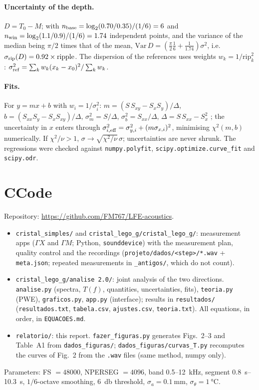 \documentclass[9pt,a4paper,twocolumn]{extarticle}
\newcommand{\umm}{\milli\metre}
\newcommand{\ukHz}{\kilo\hertz}
\newcommand{\udB}{\decibel}
\newcommand{\us}{\second}
\newcommand{\GX}{\ensuremath{\Gamma X}}
\newcommand{\GM}{\ensuremath{\Gamma M}}
\begin{document}
\paragraph{Uncertainty of the depth.} $D=T_0-M$; with $n_{\rm base}=\log_2(0.70/0.35)/(1/6)=6$ and $n_{\rm win}=\log_2(1.1/0.9)/(1/6)=1.74$ independent points, and the variance of the median being $\pi/2$ times that of the mean, $\mathrm{Var}\,D=\left(\frac\pi2\frac16+\frac1{1.74}\right)\sigma^2$, i.e.\ $\sigma_{\rm rip}(D)=0.92\times\mathrm{ripple}$. The dispersion of the references uses weights $w_k=1/\mathrm{rip}_k^2$: $\sigma_{\rm ref}^2=\sum_kw_k(x_k-x_0)^2/\sum_kw_k$.

\paragraph{Fits.} For $y=mx+b$ with $w_i=1/\sigma_i^2$: $m=(S\,S_{xy}-S_xS_y)/\Delta$, $b=(S_{xx}S_y-S_xS_{xy})/\Delta$, $\sigma_m^2=S/\Delta$, $\sigma_b^2=S_{xx}/\Delta$, $\Delta=S\,S_{xx}-S_x^2$ \cite{bev}; the uncertainty in $x$ enters through $\sigma_{i,\rm eff}^2=\sigma_{y,i}^2+(m\sigma_{x,i})^2$, minimising $\chi^2(m,b)$ numerically. If $\chi^2/\nu>1$, $\sigma\to\sqrt{\chi^2/\nu}\,\sigma$; uncertainties are never shrunk. The regressions were checked against \texttt{numpy.polyfit}, \texttt{scipy.optimize.curve\_fit} and \texttt{scipy.odr}.

\section*{C\quad Code}
Repository: \url{https://github.com/FM767/LFE-acoustics}.
\begin{itemize}\setlength{\itemsep}{0pt}
\item \texttt{cristal\_simples/} and \texttt{cristal\_lego\_g/cristal\_lego\_g/}: measurement apps (\GX{} and \GM; Python, \texttt{sounddevice}) with the measurement plan, quality control and the recordings (\texttt{projeto/dados/<step>/*.wav} + \texttt{meta.json}; repeated measurements in \texttt{\_antigos/}, which do not count).
\item \texttt{cristal\_lego\_g/analise 2.0/}: joint analysis of the two directions. \texttt{analise.py} (spectra, $T(f)$, quantities, uncertainties, fits), \texttt{teoria.py} (PWE), \texttt{graficos.py}, \texttt{app.py} (interface); results in \texttt{resultados/} (\texttt{resultados.txt}, \texttt{tabela.csv}, \texttt{ajustes.csv}, \texttt{teoria.txt}). All equations, in order, in \texttt{EQUACOES.md}.
\item \texttt{relatorio/}: this report. \texttt{fazer\_figuras.py} generates Figs.~2--3 and Table~A1 from \texttt{dados\_figuras/}; \texttt{dados\_figuras/curvas\_T.py} recomputes the curves of Fig.~2 from the \texttt{.wav} files (same method, numpy only).
\end{itemize}
Parameters: FS $=48000$, NPERSEG $=4096$, band 0.5--\SI{12}{\ukHz}, segment \SIrange{0.8}{10.3}{\us}, $1/6$-octave smoothing, \SI{6}{\udB} threshold, $\sigma_a=\SI{0.1}{\umm}$, $\sigma_\theta=\SI{1}{\celsius}$.
\end{document}

